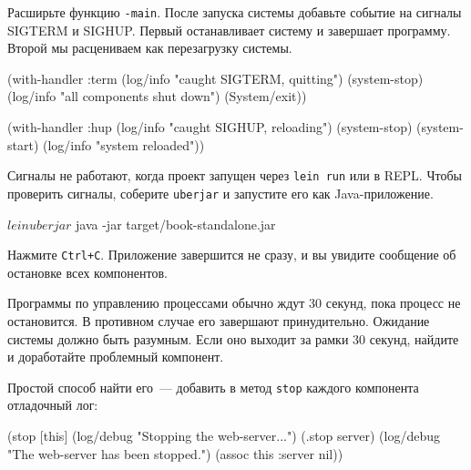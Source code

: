 \fi

Расширьте функцию \verb|-main|. После запуска системы добавьте событие на
сигналы SIGTERM и SIGHUP. Первый останавливает систему и завершает
программу. Второй мы расцениваем как перезагрузку системы.



\begin{english}
  \begin{clojure}
(with-handler :term
  (log/info "caught SIGTERM, quitting")
  (system-stop)
  (log/info "all components shut down")
  (System/exit))
  \end{clojure}
\end{english}

\pagebreaklarge

\begin{english}
  \begin{clojure}
(with-handler :hup
  (log/info "caught SIGHUP, reloading")
  (system-stop)
  (system-start)
  (log/info "system reloaded"))
  \end{clojure}
\end{english}

Сигналы не работают, когда проект запущен через \verb|lein run| или в
REPL. Чтобы проверить сигналы, соберите \verb|uberjar| и запустите его как
Java-приложение.

\begin{english}
  \begin{bash}
$ lein uberjar
$ java -jar target/book-standalone.jar
  \end{bash}
\end{english}

Нажмите \verb|Ctrl+C|. Приложение завершится не сразу, и вы увидите сообщение
об остановке всех компонентов.

Программы по управлению процессами обычно ждут 30 секунд, пока процесс не
остановится. В противном случае его завершают принудительно. Ожидание системы
должно быть разумным. Если оно выходит за рамки 30 секунд, найдите и доработайте
проблемный компонент.

Простой способ найти его~--- добавить в метод \verb|stop| каждого компонента
отладочный лог:

\begin{english}
  \begin{clojure}
(stop [this]
  (log/debug "Stopping the web-server...")
  (.stop server)
  (log/debug "The web-server has been stopped.")
  (assoc this :server nil))
  \end{clojure}
\end{english}

